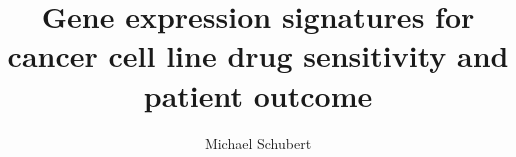 \documentclass[a4paper, headinclude, footinclude, hidelinks, BCOR=1cm]{scrbook}
\title{Gene expression signatures for cancer cell line drug sensitivity and patient outcome}
\author{Michael Schubert}
\begin{document}

\maketitle

\begingroup
    \tableofcontents
    \cleardoublepage
\endgroup















\backmatter

\printbibliography[heading=bibintoc]

\renewcommand{\thesection}{\Alph{section}}

\begin{appendices}



\end{appendices}
\end{document}
